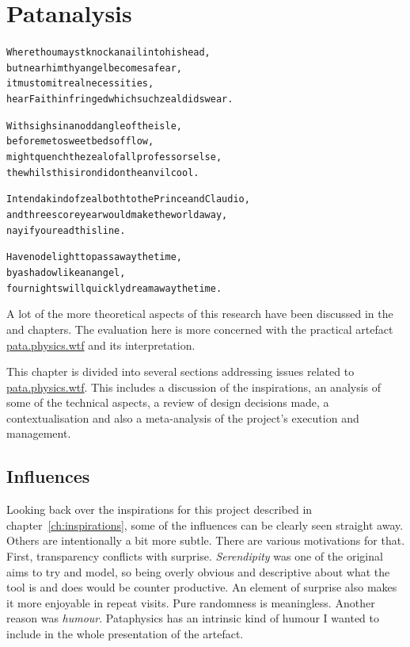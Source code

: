 
\chapter{Patanalysis}
\label{ch:analysis}

\startcontents[chapters]

\vfill

\begin{alltt}\sffamily
Where thou mayst knock a nail into his head,
but near him thy angel becomes a fear,
it must omit real necessities,
hear Faith infringed which such zeal did swear.

With sighs in an odd angle of the isle,
before me to sweet beds of flow,
might quench the zeal of all professors else,
the whilst his iron did on the anvil cool.

Intend a kind of zeal both to the Prince and Claudio,
and threescore year would make the world away,
nay if you read this line.

Have no delight to pass away the time,
by a shadow like an angel,
four nights will quickly dream away the time.
\end{alltt}

\newpage
\minicontents
\spirals

A lot of the more theoretical aspects of this research have been discussed in the  and  chapters. The evaluation here is more concerned with the practical artefact \url{pata.physics.wtf} and its interpretation.

This chapter is divided into several sections addressing issues related to \url{pata.physics.wtf}. This includes a discussion of the inspirations, an analysis of some of the technical aspects, a review of design decisions made, a contextualisation and also a meta-analysis of the project's execution and management.


\section{Influences}

Looking back over the inspirations for this project described in chapter~\ref{ch:inspirations}, some of the influences can be clearly seen straight away. Others are intentionally a bit more subtle. There are various motivations for that. First, transparency conflicts with surprise. \emph{Serendipity} was one of the original aims to try and model, so being overly obvious and descriptive about what the tool is and does would be counter productive. An element of surprise also makes it more enjoyable in repeat visits. Pure randomness is meaningless. Another reason was \emph{humour}. Pataphysics has an intrinsic kind of humour I wanted to include in the whole presentation of the artefact. 

